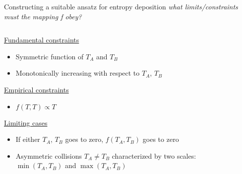 \documentclass[svgnames]{beamer}
\begin{document}
\begin{frame}[t]{Constructing a suitable ansatz for entropy deposition}
\emph{what limits/constraints must the mapping f obey?}

\vspace{0.2 in}
\begin{columns}
\begin{column}{0.9\textwidth}
\underline{Fundamental constraints}
\vspace{0.05 in}
\begin{itemize}
 \item Symmetric function of $T_A$ and $T_B$
 \item Monotonically increasing with respect to $T_A$, $T_B$
\end{itemize}
\vspace{0.1 in}
\underline{Empirical constraints}
\vspace{0.05 in}
\begin{itemize}
 \item $f(T,T) \propto T$  \\
\end{itemize}
\vspace{0.1 in}
\underline{Limiting cases}
\vspace{0.05 in}
\begin{itemize}
 \item If either $T_A$, $T_B$ goes to zero, $f(T_A,T_B)$ goes to zero
 \item Asymmetric collisions $T_A \ne T_B$ characterized by two scales: \\ $\min(T_A,T_B)$ and $\max(T_A,T_B)$
\end{itemize}
\end{column}

\end{columns}

\end{frame}
\end{document}
